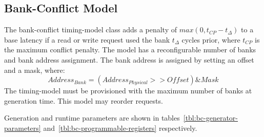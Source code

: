 \clearpage
\subsection{Bank-Conflict Model}\label{sec:bank-conflict}

The bank-conflict timing-model class adds a penalty of $max(0, t_{CP} - t_{\Delta})$ to a
base latency if a read or write request used the bank $t_{\Delta}$ cycles
prior, where $t_{CP}$ is the maximum conflict penalty. The model has a
reconfigurable number of banks and bank address assignment.  The bank address
is assigned by setting an offset and a mask, where: $$Address_{Bank} =
(Address_{Physical} >> Offset) \& Mask$$  The timing-model must be provisioned
with the maximum number of banks at generation time. This model may reorder requests.

\noindent Generation and runtime parameters are shown in
tables~\ref{tbl:bc-generator-parameters}
and~\ref{tbl:bc-programmable-registers} respectively.

\begin{table}[htb]
\begin{center}
\end{center}
\caption{Additional generation parameters of the bank conflict timing-model.}
\label{tbl:bc-generator-parameters}
\end{table}%

